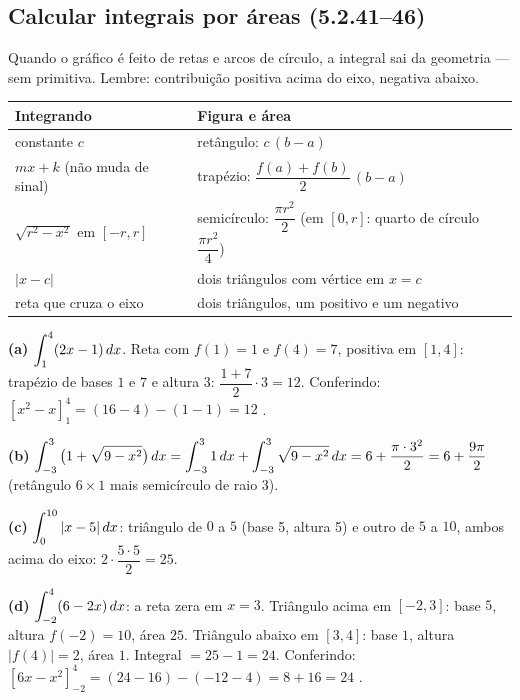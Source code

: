 \subsection{Calcular integrais por áreas (5.2.41--46)}

Quando o gráfico é feito de retas e arcos de círculo, a integral sai da geometria --- sem primitiva. Lembre: contribuição positiva acima do eixo, negativa abaixo.

\begin{center}
\small
\begin{tabular}{@{}ll@{}}
\toprule
\textbf{Integrando} & \textbf{Figura e área}\\
\midrule
constante $c$ & retângulo: $c\,(b-a)$\\
$mx+k$ (não muda de sinal) & trapézio: $\dfrac{f(a)+f(b)}{2}\,(b-a)$\\
$\sqrt{r^2-x^2}$ em $[-r,r]$ & semicírculo: $\dfrac{\pi r^2}{2}$ (em $[0,r]$: quarto de círculo $\dfrac{\pi r^2}{4}$)\\
$|x-c|$ & dois triângulos com vértice em $x=c$\\
reta que cruza o eixo & dois triângulos, um positivo e um negativo\\
\bottomrule
\end{tabular}
\end{center}

\begin{exemplo}
\textbf{(a)} $\displaystyle\int_1^4(2x-1)\,dx$. Reta com $f(1)=1$ e $f(4)=7$, positiva em $[1,4]$: trapézio de bases $1$ e $7$ e altura $3$: $\dfrac{1+7}{2}\cdot 3=12$. Conferindo: $[x^2-x]_1^4=(16-4)-(1-1)=12$ \ok.

\textbf{(b)} $\displaystyle\int_{-3}^{3}\big(1+\sqrt{9-x^2}\big)\,dx=\int_{-3}^3 1\,dx+\int_{-3}^3\sqrt{9-x^2}\,dx = 6+\frac{\pi\cdot 3^2}{2}=6+\frac{9\pi}{2}$ (retângulo $6\times1$ mais semicírculo de raio $3$).

\textbf{(c)} $\displaystyle\int_0^{10}|x-5|\,dx$: triângulo de $0$ a $5$ (base 5, altura 5) e outro de $5$ a $10$, ambos acima do eixo: $2\cdot\dfrac{5\cdot5}{2}=25$.

\textbf{(d)} $\displaystyle\int_{-2}^{4}(6-2x)\,dx$: a reta zera em $x=3$. Triângulo acima em $[-2,3]$: base $5$, altura $f(-2)=10$, área $25$. Triângulo abaixo em $[3,4]$: base $1$, altura $|f(4)|=2$, área $1$. Integral $=25-1=24$. Conferindo: $[6x-x^2]_{-2}^4=(24-16)-(-12-4)=8+16=24$ \ok.
\end{exemplo}

